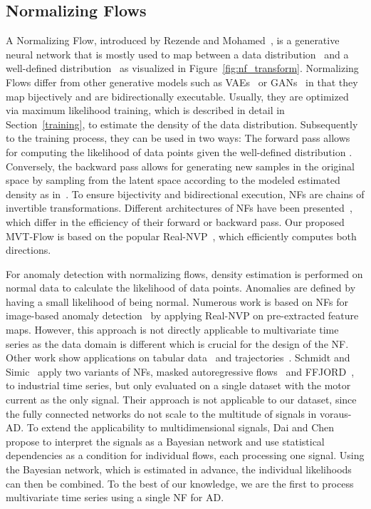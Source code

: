 \documentclass[journal]{IEEEtran}
\newcommand\datasetname{voraus-AD}
\begin{document}
\subsection{Normalizing Flows}
\label{nf_related}
A Normalizing Flow, introduced by Rezende and Mohamed~\cite{nf}, is a generative neural network that is mostly used to map between a data distribution~ and a well-defined distribution~ as visualized in Figure~\ref{fig:nf_transform}.
Normalizing Flows differ from other generative models such as VAEs~\cite{vae} or GANs~\cite{gan} in that they map bijectively and are bidirectionally executable.
Usually, they are optimized via maximum likelihood training, which is described in detail in Section~\ref{training}, to estimate the density of the data distribution.
Subsequently to the training process, they can be used in two ways:
The forward pass  allows for computing the likelihood of data points given the well-defined distribution .
Conversely, the backward pass  allows for generating new samples in the original space  by sampling from the latent space  according to the modeled estimated density as in~\cite{kingma2018glow, tomINN}.
To ensure bijectivity and bidirectional execution, NFs are chains of invertible transformations.
Different architectures of NFs have been presented~\cite{realnvp, kingma, germain, maf}, which differ in the efficiency of their forward or backward pass.
Our proposed MVT-Flow is based on the popular Real-NVP~\cite{realnvp}, which efficiently computes both directions.

For anomaly detection with normalizing flows, density estimation is performed on normal data to calculate the likelihood of data points.
Anomalies are defined by having a small likelihood of being normal.
Numerous work is based on NFs for image-based anomaly detection~\cite{differnet, csflow, cflow, yan2022cainnflow, ast} by applying Real-NVP on pre-extracted feature maps.
However, this approach is not directly applicable to multivariate time series as the data domain is different which is crucial for the design of the NF.
Other work show applications on tabular data~\cite{nf_deep} and trajectories~\cite{nf_trajectory}.
Schmidt and Simic~\cite{nf_time_series} apply two variants of NFs, masked autoregressive flows~\cite{maf} and FFJORD~\cite{ffjord}, to industrial time series, but only evaluated on a single dataset with the motor current as the only signal.
Their approach is not applicable to our dataset, since the fully connected networks do not scale to the multitude of signals in \datasetname{}.
{To extend the applicability to multidimensional signals, Dai and Chen~\cite{GANF} propose to interpret the signals as a Bayesian network and use statistical dependencies as a condition for individual flows, each processing one signal.
Using the Bayesian network, which is estimated in advance, the individual likelihoods can then be combined.
To the best of our knowledge, we are the first to process multivariate time series using a single NF for AD.}
\end{document}
